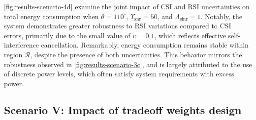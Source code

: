 \documentclass[10pt,journal,compsoc]{IEEEtran}
\theoremstyle{myremark}
\theoremstyle{myexample}
\begin{document}
\cref{fig:results-scenario-4d} examine the joint impact of \gls{CSI} and \gls{RSI} uncertainties on total energy consumption when $ \theta = 110^\circ $, $ \Upsilon_{\mathrm{snr}} = 50 $, and $ \Lambda_{\mathrm{sinr}} = 1 $. Notably, the system demonstrates greater robustness to \gls{RSI} variations compared to \gls{CSI} errors, primarily due to the small value of $ \upsilon = 0.1 $, which reflects effective self-interference cancellation. Remarkably, energy consumption remains stable within region $ \mathcal{R} $, despite the presence of both uncertainties. This behavior mirrors the robustness observed in \cref{fig:results-scenario-3c}, and is largely attributed to the use of discrete power levels, which often satisfy system requirements with excess power.










\subsection{Scenario V: Impact of tradeoff weights design}
\end{document}
